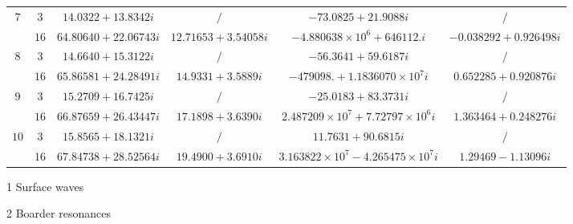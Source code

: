 \documentclass[aps,prd,longbibliography,reprint,twocolumn,amsmath,amssymb,amsfonts,showpacs,superscriptaddress]{revtex4-1}%
\begin{document}
\begin{table}[htp]
\begin{threeparttable}[htp]
\begin{ruledtabular}
\begin{tabular}{cccccc}
$7$  & $3$  & $14.0322+13.8342 i$  & $/$   & $-73.0825+21.9088 i$ & $/$     \\
     & $16$  & $64.80640+22.06743 i$  & $12.71653+3.54058 i$  & $-4.880638\times 10^6+646112. i$  & $-0.038292+0.926498 i$    \\

$8$  & $3$  & $14.6640+15.3122 i$  & $/$   & $-56.3641+59.6187 i$ & $/$     \\
     & $16$  & $65.86581+24.28491 i$  & $14.9331+3.5889 i$  & $-479098.+1.1836070\times 10^7 i$  & $0.652285+0.920876 i$    \\

$9$  & $3$  & $15.2709+16.7425 i$  & $/$   & $-25.0183+83.3731 i$ & $/$     \\
     & $16$  & $66.87659+26.43447 i$  & $17.1898+3.6390 i$  & $2.487209\times 10^7+7.72797\times 10^6 i$  & $1.363464+0.248276 i$    \\

$10$  & $3$  & $15.8565+18.1321 i$  & $/$   & $11.7631+90.6815 i$ & $/$     \\
     & $16$  & $67.84738+28.52564 i $  & $19.4900+3.6910 i$  & $3.163822\times 10^7-4.265475\times 10^7 i$  & $1.29469-1.13096 i$    \\
\end{tabular}
\end{ruledtabular}
\begin{tablenotes}
     \item[1] Surface waves
     \item[2] Boarder resonances
   \end{tablenotes}
\end{threeparttable}
\end{table}
\endgroup
\end{document}
